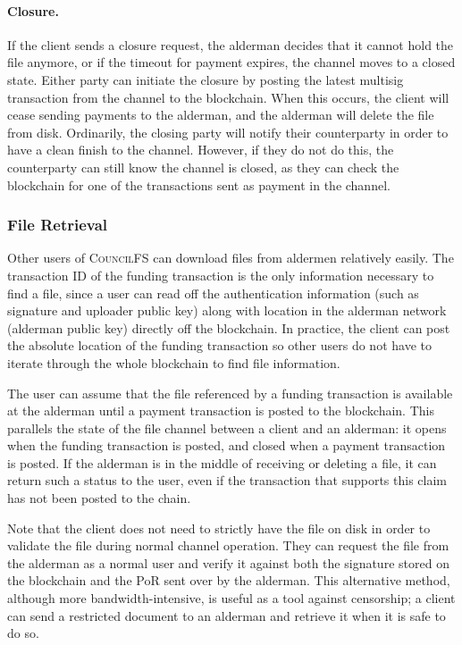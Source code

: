 \documentclass{article}
\begin{document}
\paragraph{Closure.} If the client sends a closure request, the alderman decides
that it cannot hold the file anymore, or if the timeout for payment expires, the
channel moves to a closed state. Either party can initiate the closure by
posting the latest multisig transaction from the channel to the blockchain. When
this occurs, the client will cease sending payments to the alderman, and the
alderman will delete the file from disk. Ordinarily, the closing party will
notify their counterparty in order to have a clean finish to the channel.
However, if they do not do this, the counterparty can still know the channel is
closed, as they can check the blockchain for one of the transactions sent as
payment in the channel.

\subsubsection{File Retrieval}

Other users of \textsc{CouncilFS} can download files from aldermen relatively
easily. The transaction ID of the funding transaction is the only information
necessary to find a file, since a user can read off the authentication
information (such as signature and uploader public key) along with location in
the alderman network (alderman public key) directly off the blockchain. In
practice, the client can post the absolute location of the funding transaction
so other users do not have to iterate through the whole blockchain to find file
information. 

The user can assume that the file referenced by a funding transaction is
available at the alderman until a payment transaction is posted to the
blockchain. This parallels the state of the file channel between a client and an
alderman: it opens when the funding transaction is posted, and closed when a
payment transaction is posted. If the alderman is in the middle of receiving or
deleting a file, it can return such a status to the user, even if the
transaction that supports this claim has not been posted to the chain.

Note that the client does not need to strictly have the file on disk in order to
validate the file during normal channel operation. They can request the file
from the alderman as a normal user and verify it against both the signature
stored on the blockchain and the PoR sent over by the alderman. This alternative
method, although more bandwidth-intensive, is useful as a tool against
censorship; a client can send a restricted document to an alderman and retrieve
it when it is safe to do so.
\end{document}
